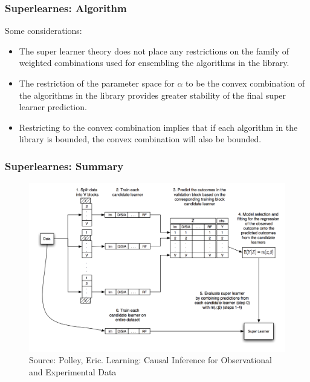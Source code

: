 \documentclass[
  shownotes,
  xcolor={svgnames},
  hyperref={colorlinks,citecolor=DarkBlue,linkcolor=DarkRed,urlcolor=DarkBlue}
  , aspectratio=169]{beamer}
\begin{document}
\begin{frame}[fragile]
\frametitle{Superlearnes: Algorithm}
Some considerations:
\begin{itemize}

\item The super learner theory does not place any restrictions on the family of weighted combinations used for ensembling the algorithms in the library.
\medskip
\item The restriction of the parameter space for $\alpha$ to be the convex combination of the algorithms in the library provides greater stability of the final super learner prediction. 

\medskip
\item Restricting to the convex combination implies that if each algorithm in the library is bounded, the convex combination will also be bounded.
\end{itemize}
\end{frame}
\begin{frame}[fragile]
\frametitle{Superlearnes: Summary}



  \begin{figure}[H] \centering
            \captionsetup{justification=centering}
              \includegraphics[scale=0.5]{figures/sl_diagram.png}
              \\
              \tiny
              Source: Polley, Eric. Learning: Causal Inference for Observational and Experimental Data
 \end{figure}

\end{frame}
\end{document}
